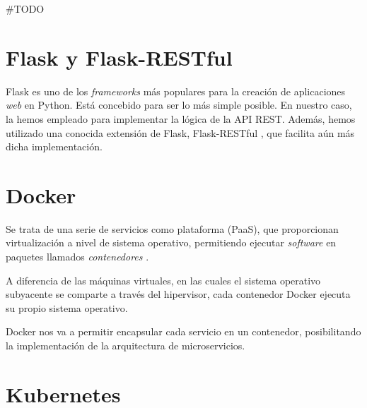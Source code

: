 \label{chapter:tecnicas}

\Huge{\#TODO}\normalsize

\section{Flask y Flask-RESTful}

Flask es uno de los \emph{frameworks} más populares para la creación de aplicaciones \emph{web} en Python\cite{flask}. Está concebido para ser lo más simple posible. En nuestro caso, la hemos empleado para implementar la lógica de la API REST. Además, hemos utilizado una conocida extensión de Flask, Flask-RESTful \cite{flaskRestful}, que facilita aún más dicha implementación.


\section{Docker}

Se trata de una serie de servicios como plataforma (PaaS), que proporcionan virtualización a nivel de sistema operativo, permitiendo ejecutar \emph{software} en paquetes llamados \emph{contenedores} \cite{docker}.

A diferencia de las máquinas virtuales, en las cuales el sistema operativo subyacente se comparte a través del hipervisor, cada contenedor Docker ejecuta su propio sistema operativo.

Docker nos va a permitir encapsular cada servicio en un contenedor, posibilitando la implementación de la arquitectura de microservicios.



\section{Kubernetes}


